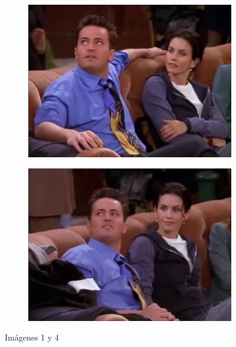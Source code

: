 \documentclass[12pt,a4paper]{article}
\begin{document}
\begin{figure}[H]
  \centering
    \begin{subfigure}{0.45\textwidth}
      \includegraphics[scale=0.33]{./Imagenes/1.png}
    \end{subfigure}
    \begin{subfigure}{0.45\textwidth}
      \includegraphics[scale=0.33]{./Imagenes/4.png}
    \end{subfigure}
    \caption{Imágenes 1 y 4}
\end{figure}
\end{document}
